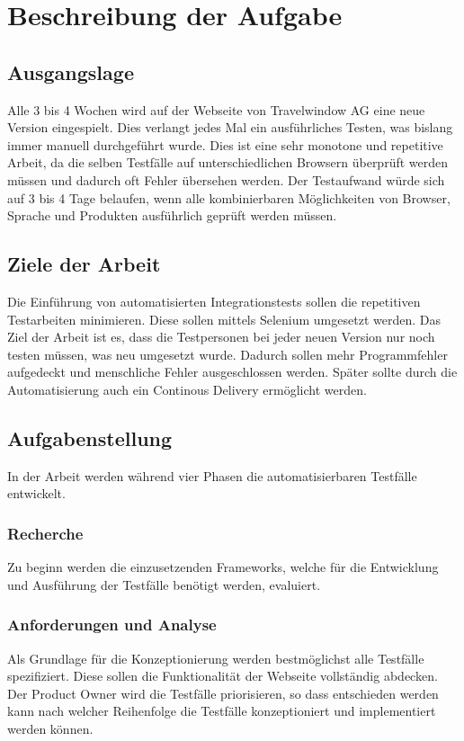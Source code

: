 \chapter{Beschreibung der Aufgabe}

\section{Ausgangslage}
Alle 3 bis 4 Wochen wird auf der Webseite von Travelwindow AG eine neue Version eingespielt. Dies verlangt jedes Mal ein ausführliches Testen, was bislang immer manuell durchgeführt wurde. Dies ist eine sehr monotone und repetitive Arbeit, da die selben Testfälle auf unterschiedlichen Browsern überprüft werden müssen und dadurch oft Fehler übersehen werden. Der Testaufwand würde sich auf 3 bis 4 Tage belaufen, wenn alle kombinierbaren Möglichkeiten von Browser, Sprache und Produkten ausführlich geprüft werden müssen.

\section{Ziele der Arbeit}
\label{sec:desc:targets}
Die Einführung von automatisierten Integrationstests sollen die repetitiven Testarbeiten minimieren. Diese sollen mittels Selenium umgesetzt werden.
Das Ziel der Arbeit ist es, dass die Testpersonen bei jeder neuen Version nur noch testen müssen, was neu umgesetzt wurde.  Dadurch sollen mehr Programmfehler aufgedeckt und menschliche Fehler ausgeschlossen werden.
Später sollte durch die Automatisierung auch ein Continous Delivery ermöglicht werden.

\section{Aufgabenstellung}
In der Arbeit werden während vier Phasen die automatisierbaren Testfälle entwickelt. 

\subsection{Recherche}
Zu beginn werden die einzusetzenden Frameworks, welche für die Entwicklung und Ausführung der Testfälle benötigt werden, evaluiert.

\subsection{Anforderungen und Analyse}
Als Grundlage für die Konzeptionierung werden bestmöglichst alle Testfälle spezifiziert. Diese sollen die Funktionalität der Webseite vollständig abdecken. Der Product Owner wird die Testfälle priorisieren, so dass entschieden werden kann nach welcher Reihenfolge die Testfälle konzeptioniert und implementiert werden können.

